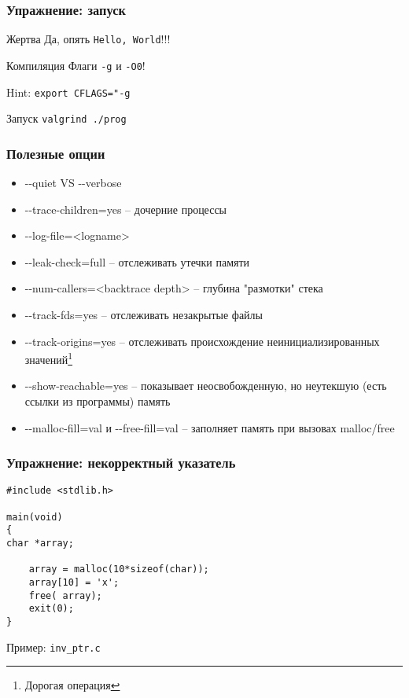 \begin{frame}[fragile]
	\frametitle{Упражнение: запуск}

	\begin{block}{Жертва}
	Да, опять {\tt Hello, World}!!!

	\end{block}

	\begin{block}{Компиляция}
		Флаги {\tt -g} и {\tt -O0}!

		Hint: {\tt export CFLAGS="-g}
	\end{block}

	\begin{block}{Запуск}
		{\tt valgrind ./prog}
	\end{block}

\end{frame}

\begin{frame}[fragile]
	\frametitle{Полезные опции}

	\begin{itemize}
		\item -{}-quiet VS -{}-verbose
		\item -{}-trace-children=yes -- дочерние процессы
		\item -{}-log-file=<logname>
		\item -{}-leak-check=full -- отслеживать утечки памяти 
		\item -{}-num-callers=<backtrace depth> -- глубина "размотки" стека
		\item -{}-track-fds=yes -- отслеживать незакрытые файлы
		\item -{}-track-origins=yes -- отслеживать происхождение неинициализированных значений\footnote{Дорогая операция}
		\item -{}-show-reachable=yes -- показывает неосвобожденную,  но неутекшую (есть ссылки из программы) память
		\item -{}-malloc-fill=val и -{}-free-fill=val -- заполняет память при вызовах malloc/free

	\end{itemize}

\end{frame}


		
\begin{frame}[fragile]
	\frametitle{Упражнение: некорректный указатель}

	\begin{lstlisting}
#include <stdlib.h>

main(void)
{
char *array;

    array = malloc(10*sizeof(char));
    array[10] = 'x';
    free( array);
    exit(0);
}
	\end{lstlisting}

	Пример: {\tt inv\_ptr.c}

\end{frame}

